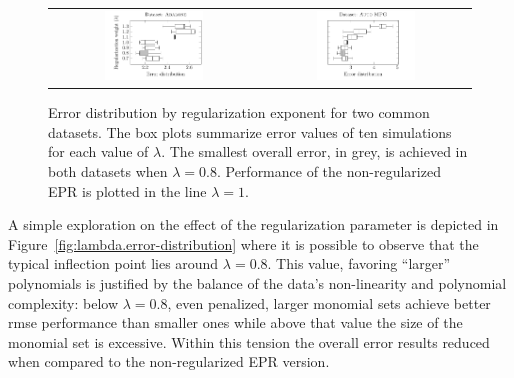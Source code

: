 \documentclass[preprint,authoryear,12pt]{elsarticle}
\begin{document}
\begin{figure}[tb]\begin{center}
\begin{tabular}{cc}
\includegraphics[width=0.49\textwidth]{figure_1a.pdf}
%
&
%
%
\includegraphics[width=0.49\textwidth]{figure_1b.pdf}
\end{tabular}

\caption{Error distribution by regularization exponent for two common datasets. The box plots summarize error values of ten simulations for each value of $\lambda$. The smallest overall error, in grey, is achieved in both datasets when $\lambda=0.8$. Performance of the non-regularized \ac{EPR} is plotted in the line $\lambda = 1$.}
\label{fig:lambda.error-distribution}\label{Abalone_dataset_lambdas}\label{Auto-MPG_dataset_lambdas}

\end{center}\end{figure}

A simple exploration on the effect of the regularization parameter is depicted in Figure~\ref{fig:lambda.error-distribution} where it is possible to observe that the typical inflection point lies around $\lambda = 0.8$. This value, favoring ``larger'' polynomials is justified by the balance of the data's non-linearity and polynomial complexity: below $\lambda = 0.8$, even penalized, larger monomial sets achieve better \ac{rmse} performance than smaller ones while above that value the size of the monomial set is excessive. Within this tension the overall error results reduced when compared to the non-regularized \ac{EPR} version.
\end{document}
